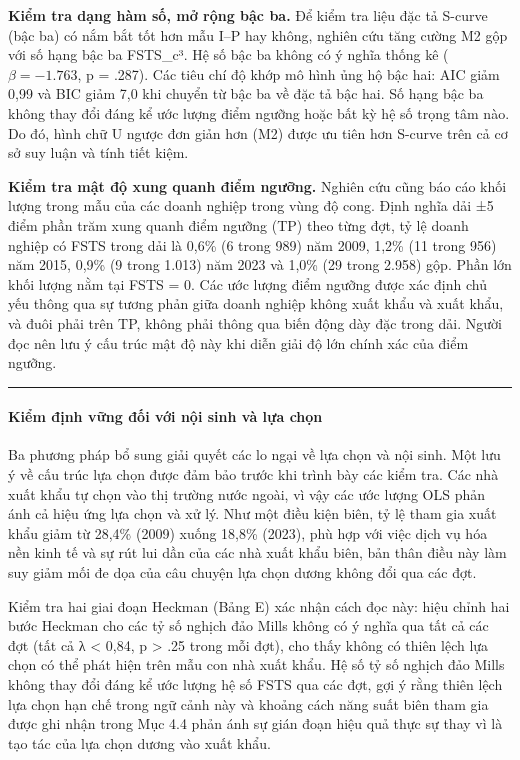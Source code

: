 \documentclass[12pt,a4paper]{article}
\begin{document}
\textbf{Kiểm tra dạng hàm số, mở rộng bậc ba.} Để kiểm tra liệu đặc tả
S-curve (bậc ba) có nắm bắt tốt hơn mẫu I--P hay không, nghiên cứu tăng
cường M2 gộp với số hạng bậc ba FSTS\_c³. Hệ số bậc ba không có ý nghĩa
thống kê (\(\beta = −1.763\), p = .287). Các tiêu chí độ khớp mô hình
ủng hộ bậc hai: AIC giảm 0,99 và BIC giảm 7,0 khi chuyển từ bậc ba về
đặc tả bậc hai. Số hạng bậc ba không thay đổi đáng kể ước lượng điểm
ngưỡng hoặc bất kỳ hệ số trọng tâm nào. Do đó, hình chữ U ngược đơn giản
hơn (M2) được ưu tiên hơn S-curve trên cả cơ sở suy luận và tính tiết
kiệm.

\textbf{Kiểm tra mật độ xung quanh điểm ngưỡng.} Nghiên cứu cũng báo cáo
khối lượng trong mẫu của các doanh nghiệp trong vùng độ cong. Định nghĩa
dải ±5 điểm phần trăm xung quanh điểm ngưỡng (TP) theo từng đợt, tỷ lệ
doanh nghiệp có FSTS trong dải là 0,6\% (6 trong 989) năm 2009, 1,2\%
(11 trong 956) năm 2015, 0,9\% (9 trong 1.013) năm 2023 và 1,0\% (29
trong 2.958) gộp. Phần lớn khối lượng nằm tại FSTS = 0. Các ước lượng
điểm ngưỡng được xác định chủ yếu thông qua sự tương phản giữa doanh
nghiệp không xuất khẩu và xuất khẩu, và đuôi phải trên TP, không phải
thông qua biến động dày đặc trong dải. Người đọc nên lưu ý cấu trúc mật
độ này khi diễn giải độ lớn chính xác của điểm ngưỡng.

\begin{center}\rule{0.5\linewidth}{0.5pt}\end{center}

\hypertarget{kiux1ec3m-ux111ux1ecbnh-vux1eefng-ux111ux1ed1i-vux1edbi-nux1ed9i-sinh-vuxe0-lux1ef1a-chux1ecdn}{%
\paragraph{Kiểm định vững đối với nội sinh và lựa
chọn}\label{kiux1ec3m-ux111ux1ecbnh-vux1eefng-ux111ux1ed1i-vux1edbi-nux1ed9i-sinh-vuxe0-lux1ef1a-chux1ecdn}}

Ba phương pháp bổ sung giải quyết các lo ngại về lựa chọn và nội sinh.
Một lưu ý về cấu trúc lựa chọn được đảm bảo trước khi trình bày các kiểm
tra. Các nhà xuất khẩu tự chọn vào thị trường nước ngoài, vì vậy các ước
lượng OLS phản ánh cả hiệu ứng lựa chọn và xử lý. Như một điều kiện
biên, tỷ lệ tham gia xuất khẩu giảm từ 28,4\% (2009) xuống 18,8\%
(2023), phù hợp với việc dịch vụ hóa nền kinh tế và sự rút lui dần của
các nhà xuất khẩu biên, bản thân điều này làm suy giảm mối đe dọa của
câu chuyện lựa chọn dương không đổi qua các đợt.

Kiểm tra hai giai đoạn Heckman (Bảng E) xác nhận cách đọc này: hiệu
chỉnh hai bước Heckman cho các tỷ số nghịch đảo Mills không có ý nghĩa
qua tất cả các đợt (tất cả \textbar λ\textbar{} \textless{} 0,84, p
\textgreater{} .25 trong mỗi đợt), cho thấy không có thiên lệch lựa chọn
có thể phát hiện trên mẫu con nhà xuất khẩu. Hệ số tỷ số nghịch đảo
Mills không thay đổi đáng kể ước lượng hệ số FSTS qua các đợt, gợi ý
rằng thiên lệch lựa chọn hạn chế trong ngữ cảnh này và khoảng cách năng
suất biên tham gia được ghi nhận trong Mục 4.4 phản ánh sự gián đoạn
hiệu quả thực sự thay vì là tạo tác của lựa chọn dương vào xuất khẩu.
\end{document}
